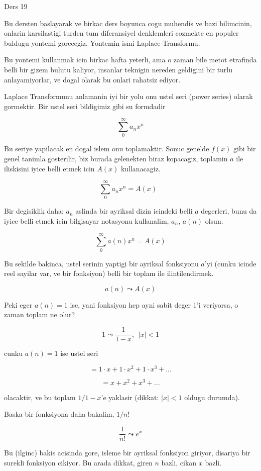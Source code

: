 \documentclass[12pt,fleqn]{article}
\begin{document}
Ders 19 

Bu dersten baslayarak ve birkac ders boyunca cogu muhendis ve bazi
bilimcinin, onlarin karsilastigi turden tum diferansiyel denklemleri
cozmekte en populer buldugu yontemi gorecegiz. Yontemin ismi Laplace
Transformu. 

Bu yontemi kullanmak icin birkac hafta yeterli, ama o zaman bile metot
etrafinda belli bir gizem bulutu kaliyor, insanlar teknigin nereden
geldigini bir turlu anlayamiyorlar, ve dogal olarak bu onlari rahatsiz
ediyor.  

Laplace Transformunu anlamanin iyi bir yolu onu ustel seri (power series)
olarak gormektir. Bir ustel seri bildigimiz gibi su formdadir

\[ \sum_{0}^{\infty} a_n x^n \]

Bu seriye yapilacak en dogal islem onu toplamaktir. Sonuc genelde $f(x)$
gibi bir genel tanimla gosterilir, biz burada gelenekten biraz kopacagiz,
toplamin $a$ ile iliskisini iyice belli etmek icin $A(x)$ kullanacagiz. 

\[ \sum_{0}^{\infty} a_n x^n = A(x)
\ \ \ \label{1}
\]

Bir degisiklik daha: $a_n$ aslinda bir ayriksal dizin icindeki belli $a$
degerleri, bunu da iyice belli etmek icin bilgisayar notasyonu kullanalim,
$a_n$, $a(n)$ olsun. 

\[ \sum_{0}^{\infty} a(n) x^n = A(x)\]

Bu sekilde bakinca, ustel serinin yaptigi bir ayriksal fonksiyonu $a$'yi
(cunku icinde reel sayilar var, ve bir fonksiyon) belli bir toplam ile
ilintilendirmek. 

\[ a(n) \leadsto A(x) \]

Peki eger $a(n) = 1$ ise, yani fonksiyon hep ayni sabit deger 1'i
veriyorsa, o zaman toplam ne olur? 

\[ 1 \leadsto \frac{1}{1-x}, \ \ |x|<1 \]

cunku $a(n) = 1$ ise ustel seri 

\[ = 1 \cdot x + 1 \cdot x^2 + 1 \cdot x^3 + ... \]

\[ = x + x^2 + x^3 + ... \]

olacaktir, ve bu toplam $1/1-x$'e yaklasir (dikkat: $|x|<1$ oldugu
durumda). 

Baska bir fonksiyona daha bakalim, $1 / n!$ 

\[ \frac{1}{n!} \leadsto e^x \]

Bu (ilginc) bakis acisinda gore, isleme bir ayriksal fonksiyon giriyor,
disariya bir surekli fonksiyon cikiyor. Bu arada dikkat, giren $n$ bazli, cikan $x$
bazli. 
\end{document}
